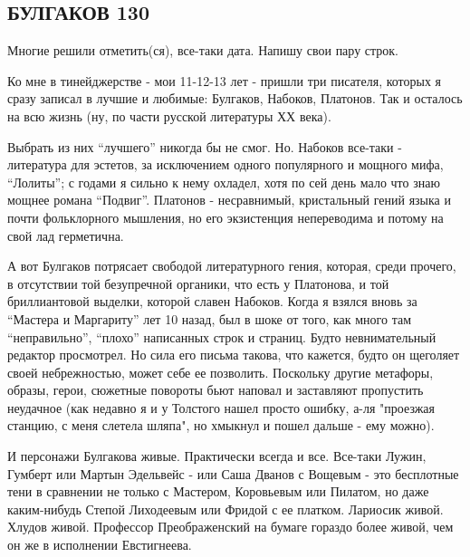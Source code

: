  
 
 
 
 

\subsection{БУЛГАКОВ 130}
\label{sec:15_05_2021.fb.dolin_anton.1.bulgakov}

Многие решили отметить(ся), все-таки дата. Напишу свои пару строк. 

Ко мне в тинейджерстве - мои 11-12-13 лет - пришли три писателя, которых я
сразу записал в лучшие и любимые: Булгаков, Набоков, Платонов. Так и осталось
на всю жизнь (ну, по части русской литературы ХХ века). 

Выбрать из них \enquote{лучшего} никогда бы не смог. Но. Набоков все-таки - литература
для эстетов, за исключением одного популярного и мощного мифа, \enquote{Лолиты}; с
годами я сильно к нему охладел, хотя по сей день мало что знаю мощнее романа
\enquote{Подвиг}. Платонов - несравнимый, кристальный гений языка и почти фольклорного
мышления, но его экзистенция непереводима и потому на свой лад герметична. 

А вот Булгаков потрясает свободой литературного гения, которая, среди прочего,
в отсутствии той безупречной органики, что есть у Платонова, и той
бриллиантовой выделки, которой славен Набоков. Когда я взялся вновь за \enquote{Мастера
и Маргариту} лет 10 назад, был в шоке от того, как много там \enquote{неправильно},
\enquote{плохо} написанных строк и страниц. Будто невнимательный редактор просмотрел.
Но сила его письма такова, что кажется, будто он щеголяет своей небрежностью,
может себе ее позволить. Поскольку другие метафоры, образы, герои, сюжетные
повороты бьют наповал и заставляют пропустить неудачное (как недавно я и у
Толстого нашел просто ошибку, а-ля "проезжая станцию, с меня слетела шляпа", но
хмыкнул и пошел дальше - ему можно).

И персонажи Булгакова живые. Практически всегда и все. Все-таки Лужин, Гумберт
или Мартын Эдельвейс - или Саша Дванов с Вощевым - это бесплотные тени в
сравнении не только с Мастером, Коровьевым или Пилатом, но даже каким-нибудь
Степой Лиходеевым или Фридой с ее платком. Лариосик живой. Хлудов живой.
Профессор Преображенский на бумаге гораздо более живой, чем он же в исполнении
Евстигнеева. 

